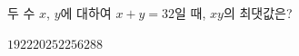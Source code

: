 두 수 $x$, $y$에 대하여 $x+y=32$일 때, $xy$의 최댓값은?
\begin{choices32}{$192$}{$220$}{$252$}{$256$}{$288$}\end{choices32}
